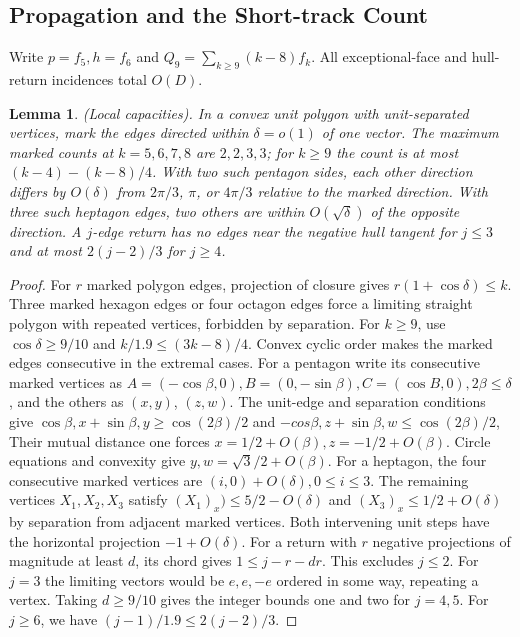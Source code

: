 \documentclass[10pt,reqno]{amsart}
\newtheorem{lemma}{Lemma}[section]
\begin{document}
\subsection{Propagation and the Short-track Count}


Write $p = f_5, h = f_6$ and $Q_9 = \sum_{k \ge 9}(k - 8) f_k$. All exceptional-face and hull-return incidences total $O(D)$.

\begin{lemma}
    (Local capacities). In a convex unit polygon with unit-separated vertices, mark the edges directed within $\delta = o(1)$ of one vector. The maximum marked counts at $k = 5, 6, 7, 8$ are $2, 2, 3, 3$; for $k \ge 9$ the count is at most $(k - 4) - (k - 8)/4$. With two such pentagon sides, each other direction differs by $O(\delta)$ from $2 \pi / 3$, $\pi$, or $4 \pi / 3$ relative to the marked direction. With three such heptagon edges, two others are within $O(\sqrt{\delta})$ of the opposite direction. A $j$-edge return has no edges near the negative hull tangent for $j \le 3$ and at most $2(j - 2) / 3$ for $j \ge 4$.
\end{lemma}

\begin{proof}
    For $r$ marked polygon edges, projection of closure gives $r(1 + \cos \delta) \le k$. Three marked hexagon edges or four octagon edges force a limiting straight polygon with repeated vertices, forbidden by separation. For $k \ge 9$, use $\cos \delta \ge 9 / 10$ and $k / 1.9 \le (3k - 8) / 4$. Convex cyclic order makes the marked edges consecutive in the extremal cases. For a pentagon write its consecutive marked vertices as $A = ( - \cos \beta, 0), B = (0, - \sin \beta), C = (\cos B, 0), 2 \beta \le \delta$, and the others as $(x, y)$, $(z, w)$. The unit-edge and separation conditions give $\cos \beta, x + \sin \beta, y \ge \cos (2\beta)/ 2 $ and $-cos \beta, z + \sin \beta, w \le \cos (2 \beta) / 2$, Their mutual distance one forces $x = 1/2 + O (\beta), z = -1/2 + O(\beta)$. Circle equations and convexity give $y, w = \sqrt3 / 2 + O(\beta)$. For a heptagon, the four consecutive marked vertices are $(i, 0) + O(\delta), 0 \le i \le 3$. The remaining vertices $X_1, X_2, X_3$ satisfy $(X_1)_x) \le 5 / 2 - O(\delta)$ and $(X_3)_x \le 1/2 + O(\delta)$ by separation from adjacent marked vertices. Both intervening unit steps have the horizontal projection $-1 + O(\delta)$. For a return with $r$ negative projections of magnitude at least $d$, its chord gives $1 \le j - r - dr$. This excludes $j \le 2$. For $j = 3$ the limiting vectors would be $e, e, -e$ ordered in some way, repeating a vertex. Taking $d \ge 9 / 10$ gives the integer bounds one and two for $j = 4, 5$. For $j \ge 6$, we have $(j - 1) / 1.9 \le 2(j-2) / 3$.
\end{proof}
\end{document}
